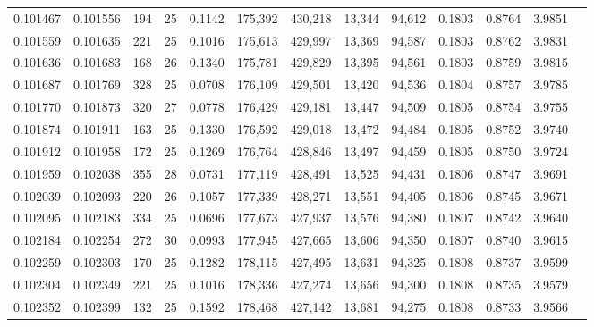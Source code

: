 \begin{tabular}{rrrrrrrrrrrrr}
0.101467 & 0.101556 & 194 &  25 &                                     0.1142 & 175,392 & 430,218 &  13,344 &  94,612 & 0.1803 & 0.8764 & 3.9851 \\
0.101559 & 0.101635 & 221 &  25 &                                     0.1016 & 175,613 & 429,997 &  13,369 &  94,587 & 0.1803 & 0.8762 & 3.9831 \\
0.101636 & 0.101683 & 168 &  26 &                                     0.1340 & 175,781 & 429,829 &  13,395 &  94,561 & 0.1803 & 0.8759 & 3.9815 \\
0.101687 & 0.101769 & 328 &  25 &                                     0.0708 & 176,109 & 429,501 &  13,420 &  94,536 & 0.1804 & 0.8757 & 3.9785 \\
0.101770 & 0.101873 & 320 &  27 &                                     0.0778 & 176,429 & 429,181 &  13,447 &  94,509 & 0.1805 & 0.8754 & 3.9755 \\
0.101874 & 0.101911 & 163 &  25 &                                     0.1330 & 176,592 & 429,018 &  13,472 &  94,484 & 0.1805 & 0.8752 & 3.9740 \\
0.101912 & 0.101958 & 172 &  25 &                                     0.1269 & 176,764 & 428,846 &  13,497 &  94,459 & 0.1805 & 0.8750 & 3.9724 \\
0.101959 & 0.102038 & 355 &  28 &                                     0.0731 & 177,119 & 428,491 &  13,525 &  94,431 & 0.1806 & 0.8747 & 3.9691 \\
0.102039 & 0.102093 & 220 &  26 &                                     0.1057 & 177,339 & 428,271 &  13,551 &  94,405 & 0.1806 & 0.8745 & 3.9671 \\
0.102095 & 0.102183 & 334 &  25 &                                     0.0696 & 177,673 & 427,937 &  13,576 &  94,380 & 0.1807 & 0.8742 & 3.9640 \\
0.102184 & 0.102254 & 272 &  30 &                                     0.0993 & 177,945 & 427,665 &  13,606 &  94,350 & 0.1807 & 0.8740 & 3.9615 \\
0.102259 & 0.102303 & 170 &  25 &                                     0.1282 & 178,115 & 427,495 &  13,631 &  94,325 & 0.1808 & 0.8737 & 3.9599 \\
0.102304 & 0.102349 & 221 &  25 &                                     0.1016 & 178,336 & 427,274 &  13,656 &  94,300 & 0.1808 & 0.8735 & 3.9579 \\
0.102352 & 0.102399 & 132 &  25 &                                     0.1592 & 178,468 & 427,142 &  13,681 &  94,275 & 0.1808 & 0.8733 & 3.9566 \\

\end{tabular}
